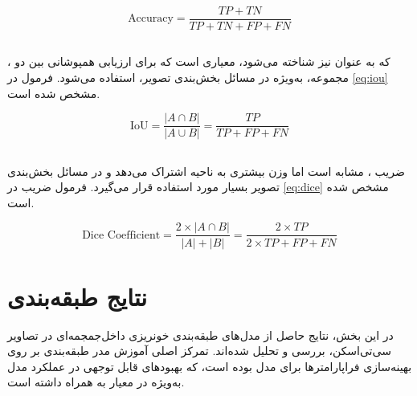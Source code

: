 \begin{latin}
\begin{equation}
\label{eq:accuracy}
\text{Accuracy} = \frac{TP + TN}{TP + TN + FP + FN}
\end{equation}
\end{latin}

\subsection{}

، که به عنوان  نیز شناخته می‌شود، معیاری است که برای ارزیابی همپوشانی بین دو مجموعه، به‌ویژه در مسائل بخش‌بندی تصویر، استفاده می‌شود. فرمول  در \autoref{eq:iou} مشخص شده است.

\begin{latin}
\begin{equation}
\label{eq:iou}
\text{IoU} = \frac{|A \cap B|}{|A \cup B|} = \frac{TP}{TP + FP + FN}
\end{equation}
\end{latin}

\subsection{}

ضریب ، مشابه  است اما وزن بیشتری به ناحیه اشتراک می‌دهد و در مسائل بخش‌بندی تصویر بسیار مورد استفاده قرار می‌گیرد. فرمول ضریب  در \autoref{eq:dice} مشخص شده است.

\begin{latin}
\begin{equation}
\label{eq:dice}
\text{Dice Coefficient} = \frac{2 \times |A \cap B|}{|A| + |B|} = \frac{2 \times TP}{2 \times TP + FP + FN}
\end{equation}
\end{latin}

\section{نتایج طبقه‌بندی}

در این بخش، نتایج حاصل از مدل‌های طبقه‌بندی خونریزی داخل‌جمجمه‌ای در تصاویر سی‌تی‌اسکن، بررسی و تحلیل شده‌اند. تمرکز اصلی آموزش مدر طبقه‌بندی بر روی بهینه‌سازی فراپارامترها برای مدل
  بوده است، که بهبودهای قابل توجهی در عملکرد مدل به‌ویژه در معیار 
   به همراه داشته است.

